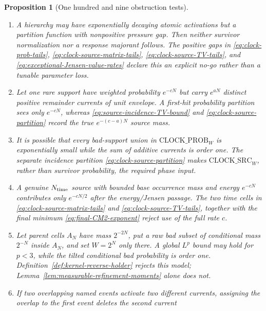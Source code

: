 \documentclass[11pt]{article}
\newtheorem{proposition}[theorem]{Proposition}
\begin{document}
\begin{proposition}[One hundred and nine obstruction tests]
\begin{enumerate}[label=\textup{(T\arabic*)}]
      endpoint scale, or $\widetilde G_N^\pm$.  The survivor indicator in
      \eqref{eq:upper-scale-excess-tail} prevents the upper-scale ledger from
      evaluating a nonexistent random variable; cemetery mass is charged by
      $\mathrm{CEM\_DOM}$ and $\mathrm{CLOCK\_PROB}_{W}$.
\item A hierarchy may have exponentially decaying atomic activations but a
      partition function with nonpositive pressure gap.  Then neither
      survivor normalization nor a response majorant follows.  The positive
      gaps in \eqref{eq:clock-prob-tails},
      \eqref{eq:clock-source-matrix-tails},
      \eqref{eq:clock-source-TV-tails}, and
      \eqref{eq:exceptional-Jensen-value-rates} declare this an explicit
      no-go rather than a tunable parameter loss.
\item Let one rare support have weighted probability $e^{-cN}$ but carry
      $e^{aN}$ distinct positive remainder currents of unit envelope.  A
      first-hit probability partition sees only $e^{-cN}$, whereas
      \eqref{eq:source-incidence-TV-bound} and
      \eqref{eq:clock-source-partition} record the true
      $e^{-(c-a)N}$ source mass.
\item It is possible that every bad-support union in
      $\mathrm{CLOCK\_PROB}_{W}$ is exponentially small while the sum of
      additive currents is order one.  The separate incidence partition
      \eqref{eq:clock-source-partition} makes
      $\mathrm{CLOCK\_SRC}_{W}$, rather than survivor probability, the
      required phase input.
\item A genuine $N_{\rm time}$ source with bounded base occurrence mass and
      energy $e^{-cN}$ contributes only $e^{-cN/2}$ after the
      energy/Jensen passage.  The two time
      cells in \eqref{eq:clock-source-matrix-tails} and
      \eqref{eq:clock-source-TV-tails}, together with the final minimum
      \eqref{eq:final-CM2-exponent} reject use of the full rate $c$.
\item Let parent cells $A_N$ have mass $2^{-2N}$, put a raw bad subset of
      conditional mass $2^{-N}$ inside $A_N$, and set $W=2^N$ only there.
      A global $L^p$ bound may hold for $p<3$, while the tilted conditional
      bad probability is order one.  Definition~\ref{def:kernel-reverse-holder}
      rejects this model; Lemma~\ref{lem:measurable-refinement-moments} alone
      does not.
\item If two overlapping named events activate two different currents,
      assigning the overlap to the first event deletes the second current

\end{enumerate}
\end{proposition}
\end{document}
